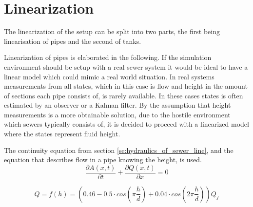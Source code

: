 \section{Linearization}\label{se:linearization}
The linearization of the setup can be split into two parts, the first being linearisation of pipes and the second of tanks. 

Linearization of pipes is elaborated in the following.
If the simulation environment should be setup with a real sewer system it would be ideal to have a linear model which could mimic a real world situation.
In real systems measurements from all states, which in this case is flow and height in the amount of sections each pipe consists of, is rarely available.
In these cases states is often estimated by an observer or a Kalman filter. By the assumption that height measurements is a more obtainable solution, due to the hostile environment which sewers typically consists of, it is decided to proceed with a linearized model where the states represent fluid height.

The continuity equation from section \ref{se:hydraulics_of_sewer_line}, and the equation that describes flow in a pipe knowing the height, is used. 
\begin{equation}\label{eq:linearization_Continuity}
\frac{\partial A(x,t)}{\partial t} + \frac{\partial Q(x,t)}{\partial x}=0
\end{equation}

\begin{equation}\label{eq:flow_eq_given_a_height}
	Q = f(h) = \left(0.46-0.5 \cdot cos\left(\pi \frac{h}{d}\right)+0.04\cdot cos\left(2\pi\frac{h}{d}\right)\right)Q_f
\end{equation}



